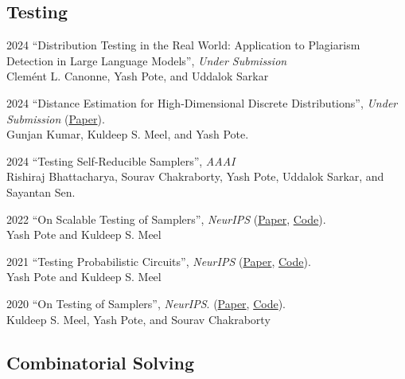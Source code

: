 \documentclass[12pt,letterpaper]{report}
\begin{document}
	
	\subsection*{Testing}
	\begin{tablist} 
	\item[2024] \tab  	\enquote{Distribution Testing in the Real World: Application to Plagiarism Detection in Large Language Models}, \textit{Under Submission}\\
		Clemént L. Canonne, Yash Pote, and Uddalok Sarkar
		
		\item[2024] \tab  	\enquote{Distance Estimation for High-Dimensional Discrete Distributions}, \textit{Under Submission} (\href{https://arxiv.org/abs/2308.04264}{Paper}).\\
		Gunjan Kumar,  Kuldeep S. Meel, and Yash Pote.

    	\item[2024] \tab \enquote{Testing Self-Reducible Samplers},  \textit{AAAI}\\
		Rishiraj Bhattacharya, Sourav Chakraborty, Yash Pote, Uddalok Sarkar, and Sayantan Sen.
		
		\item[2022] \tab  \enquote{On Scalable Testing of Samplers},  \textit{NeurIPS}  (\href{https://arxiv.org/abs/2306.13958}{Paper}, \href{https://github.com/meelgroup/barbarik}{Code}).\\
		Yash Pote  and Kuldeep S. Meel
		
	
		\item[2021] \tab  \enquote{Testing Probabilistic Circuits},  \textit{NeurIPS}  (\href{https://arxiv.org/abs/2112.04941}{Paper}, \href{https://github.com/meelgroup/teq}{Code}).\\
		Yash Pote  and Kuldeep S. Meel
		
		
		\item[2020] \tab  \enquote{On Testing of Samplers}, \textit{NeurIPS}. (\href{https://arxiv.org/abs/2010.12918}{Paper}, \href{https://github.com/meelgroup/barbarik}{Code}).\\
		Kuldeep S. Meel, Yash Pote, and Sourav Chakraborty
		
	\end{tablist}

	\subsection*{Combinatorial Solving}
\end{document}
